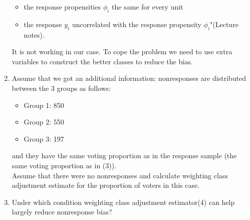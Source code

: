 \documentclass[12pt]{article}
\begin{document}
\begin{enumerate}
{\begin{minipage}[t]{0.97\linewidth}
\begin{itemize}
\item the response propensities $\phi_i$ the same for every unit
\item the response $y_i$ uncorrelated with the response propensity $\phi_i$"(Lecture notes).
\end{itemize}
 It is not working in our case. To cope the problem we need to use extra variables to construct the better classes to reduce the bias.
\end{minipage}}
\item
Assume that we got an additional information: nonresponses are distributed between the 3 groups as follows:  
\begin{itemize}
\item Group 1: 850
\item Group 2: 550
\item Group 3: 197
\end{itemize}
and they have the same voting proportion as in the response sample (the same voting proportion as in (3)).\\
Assume that there were no nonresponses and calculate weighting class adjustment estimate for the proportion of voters in this case.\\
\item Under which condition weighting class adjustment estimator(4) can help largely reduce nonresponse bias? \\
\end{enumerate}
\end{document}

